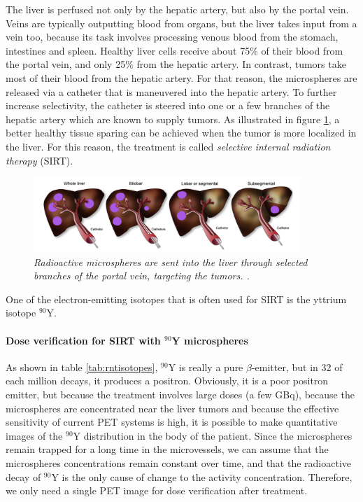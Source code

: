 \documentclass[11pt,oneside]{article}
\begin{document}
The liver is perfused not only by the hepatic artery, but also by the
portal vein. Veins are typically outputting blood from organs, but the
liver takes input from a vein too, because its task involves
processing venous blood from the stomach, intestines and
spleen. Healthy liver cells receive about 75\% of their blood from the
portal vein, and only 25\% from the hepatic artery. In contrast,
tumors take most of their blood from the hepatic artery. For that
reason, the microspheres are released via a catheter that is
maneuvered into the hepatic artery. To further increase selectivity,
the catheter is steered into one or a few branches of the hepatic
artery which are known to supply tumors. As illustrated in figure
\ref{fig:Sangro}, a better healthy tissue sparing can be achieved when
the tumor is more localized in the liver. For this reason, the
treatment is called {\em selective internal radiation therapy} (SIRT).
\begin{figure}[tb]
\centering
\includegraphics[width=0.9\textwidth]{figs/fig_SIRT_Sangro.png}
\caption{\label{fig:Sangro} \emph{Radioactive microspheres are sent
    into the liver through selected branches of the portal vein, targeting
    the tumors. \cite{Sangro2012}.}}
\end{figure}
One of the electron-emitting isotopes that is often used for SIRT
is the yttrium isotope $^{90}$Y. 

\paragraph{Dose verification for SIRT with $^{90}$Y microspheres}
As shown in table \ref{tab:rntisotopes}, $^{90}$Y is really a pure
$\beta$-emitter, but in 32 of each million decays, it produces a
positron. Obviously, it is a poor positron emitter, but because the
treatment involves large doses (a few GBq), because the microspheres
are concentrated near the liver tumors and because the effective
sensitivity of current PET systems is high, it is possible to make
quantitative images of the $^{90}$Y distribution in the body of the
patient. Since the microspheres remain trapped for a long time in the
microvessels, we can assume that the microspheres concentrations
remain constant over time, and that the radioactive decay of $^{90}$Y
is the only cause of change to the activity concentration. Therefore,
we only need a single PET image for dose verification after
treatment. 
\end{document}
